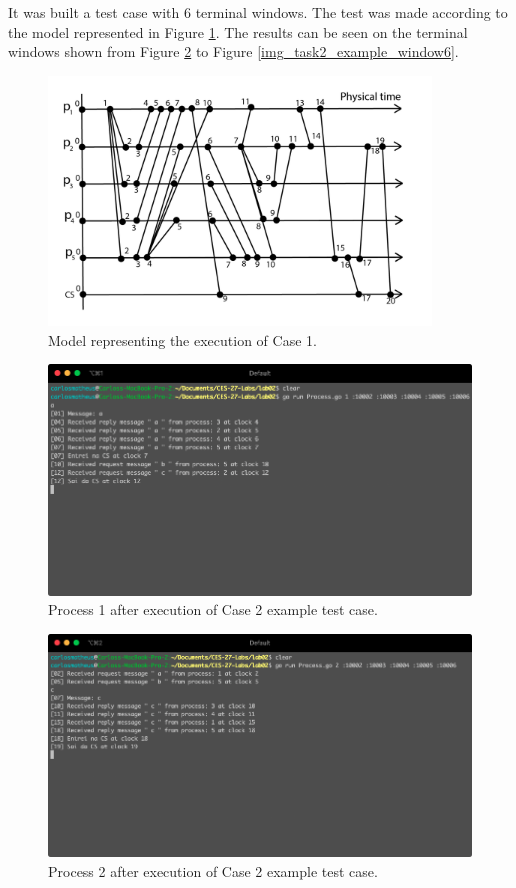 \documentclass[a4paper, 11pt]{article}
\begin{document}
It was built a test case with 6 terminal windows. The test was made according to the model represented in Figure \ref{img_task2}. The results can be seen on the terminal windows shown from Figure \ref{img_task2_example_window1} to Figure \ref{img_task2_example_window6}.

\begin{figure}[h]
  \begin{center}
  \includegraphics[width=4in]{./imgs/case2.png}
  \caption{Model representing the execution of Case 1.}
  \label{img_task2}
  \end{center}
\end{figure}

\begin{figure}[h]
  \begin{center}
  \includegraphics[width=4.5in]{./imgs/case2process1.png}
  \caption{Process 1 after execution of Case 2 example test case.}
  \label{img_task2_example_window1}
  \end{center}
\end{figure}

\begin{figure}[h]
  \begin{center}
  \includegraphics[width=4.5in]{./imgs/case2process2.png}
  \caption{Process 2 after execution of Case 2 example test case.}
  \label{img_task2_example_window2}
  \end{center}
\end{figure}
\end{document}
